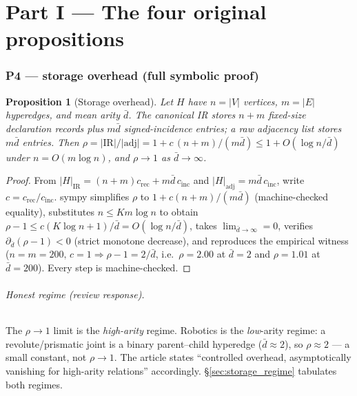 \documentclass[11pt]{article}
\newtheorem{proposition}{Proposition}
\theoremstyle{definition}
\begin{document}
\part*{Part I --- The four original propositions}

\section{P4 --- storage overhead (full symbolic proof)}
\label{sec:p4}

\begin{proposition}[Storage overhead]
Let $H$ have $n=|V|$ vertices, $m=|E|$ hyperedges, and mean arity $\bar d$. The canonical IR stores $n+m$
fixed-size declaration records plus $m\bar d$ signed-incidence entries; a raw adjacency list stores $m\bar d$
entries. Then $\rho = |\mathrm{IR}|/|\mathrm{adj}| = 1 + c\,(n+m)/(m\bar d) \le 1 + O(\log n/\bar d)$ under
$n = O(m\log n)$, and $\rho\to1$ as $\bar d \to \infty$.
\end{proposition}

\begin{proof}
From $|H|_{\mathrm{IR}} = (n+m)c_{\mathrm{rec}} + m\bar d\,c_{\mathrm{inc}}$ and $|H|_{\mathrm{adj}} =
m\bar d\,c_{\mathrm{inc}}$, write $c=c_{\mathrm{rec}}/c_{\mathrm{inc}}$. \textsf{sympy} simplifies $\rho$ to
$1 + c(n+m)/(m\bar d)$ (machine-checked equality), substitutes $n\le Km\log n$ to obtain $\rho-1 \le
c(K\log n+1)/\bar d = O(\log n/\bar d)$, takes $\lim_{\bar d\to\infty}=0$, verifies $\partial_{\bar d}(\rho-1)<0$
(strict monotone decrease), and reproduces the empirical witness ($n=m=200,\,c=1 \Rightarrow \rho-1=2/\bar d$,
i.e.\ $\rho=2.00$ at $\bar d=2$ and $\rho=1.01$ at $\bar d=200$). Every step is machine-checked.
\end{proof}

\paragraph{Honest regime (review response).} The $\rho\to1$ limit is the \emph{high-arity} regime. Robotics is
the \emph{low}-arity regime: a revolute/prismatic joint is a binary parent--child hyperedge ($\bar d\approx2$),
so $\rho\approx2$ --- a small constant, not $\rho\to1$. The article states ``controlled overhead, asymptotically
vanishing for high-arity relations'' accordingly. \S\ref{sec:storage_regime} tabulates both regimes.
\end{document}
